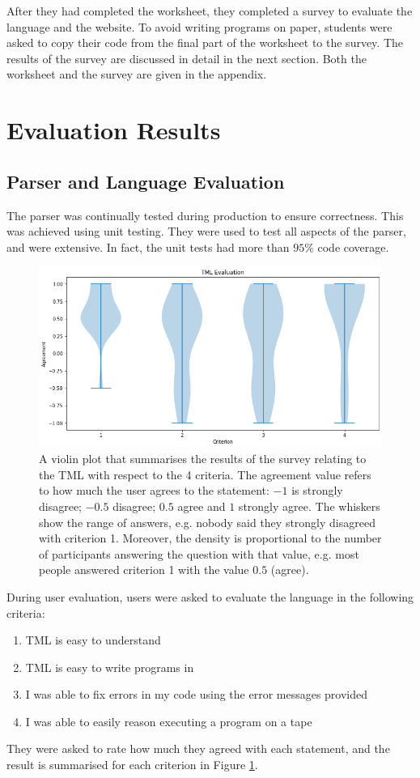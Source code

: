 After they had completed the worksheet, they completed a survey to evaluate the language and the website. To avoid writing programs on paper, students were asked to copy their code from the final part of the worksheet to the survey. The results of the survey are discussed in detail in the next section. Both the worksheet and the survey are given in the appendix. 

\section{Evaluation Results}
\subsection{Parser and Language Evaluation}
The parser was continually tested during production to ensure correctness. This was achieved using unit testing. They were used to test all aspects of the parser, and were extensive. In fact, the unit tests had more than $95\%$ code coverage.

\begin{figure}
    \centering
    \includegraphics[scale=0.35]{data/tml-evaluation.png}
    \caption{A violin plot that summarises the results of the survey relating to the TML with respect to the 4 criteria. The agreement value refers to how much the user agrees to the statement: $-1$ is strongly disagree; $-0.5$ disagree; $0.5$ agree and $1$ strongly agree. The whiskers show the range of answers, e.g. nobody said they strongly disagreed with criterion 1. Moreover, the density is proportional to the number of participants answering the question with that value, e.g. most people answered criterion 1 with the value $0.5$ (agree).}
    \label{fig:tml-evaluation}
\end{figure}

During user evaluation, users were asked to evaluate the language in the following criteria:
\begin{enumerate}
    \item TML is easy to understand
    \item TML is easy to write programs in
    \item I was able to fix errors in my code using the error messages provided
    \item I was able to easily reason executing a program on a tape
\end{enumerate}
They were asked to rate how much they agreed with each statement, and the result is summarised for each criterion in Figure \ref{fig:tml-evaluation}. 

